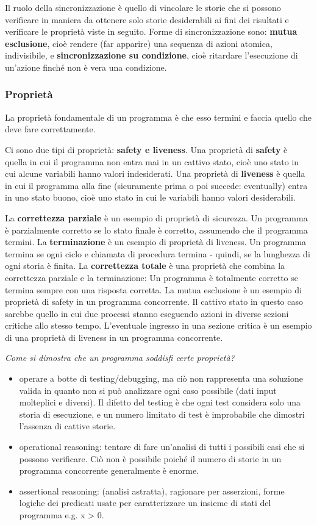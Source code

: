 \documentclass[10pt,a4paper]{article}
\begin{document}
Il ruolo della sincronizzazione è quello di vincolare le storie che si possono verificare in maniera da ottenere solo storie desiderabili ai fini dei risultati e verificare le proprietà viste in seguito.
Forme di sincronizzazione sono: \textbf{mutua esclusione}, cioè rendere (far apparire) una sequenza di azioni atomica, indivisibile, e \textbf{sincronizzazione su condizione}, cioè ritardare l'esecuzione di un'azione finché non è vera una condizione.

\subsubsection{Proprietà}
\label{sec:prop-prog}
La proprietà fondamentale di un programma è che esso termini e faccia quello che deve fare correttamente.

Ci sono due tipi di proprietà: \textbf{safety e liveness}. Una proprietà di \textbf{safety} è quella in cui il programma non entra mai in un cattivo stato, cioè uno stato in cui alcune variabili hanno valori indesiderati.
Una proprietà di \textbf{liveness} è quella in cui il programma alla fine (sicuramente prima o poi succede: eventually) entra in uno stato buono, cioè uno stato in cui le variabili hanno valori desiderabili.

La \textbf{correttezza parziale} è un esempio di proprietà di sicurezza. Un programma è parzialmente corretto se lo stato finale è corretto, assumendo che il programma termini.
La \textbf{terminazione} è un esempio di proprietà di liveness. Un programma termina se ogni ciclo e chiamata di procedura termina - quindi, se la lunghezza di ogni storia è finita. La \textbf{correttezza totale} è una proprietà che combina la correttezza parziale e la terminazione: Un programma è totalmente corretto se termina sempre con una risposta corretta.
La mutua esclusione è un esempio di proprietà di safety in un programma concorrente. Il cattivo stato in questo caso sarebbe quello in cui due processi stanno eseguendo azioni in diverse sezioni critiche allo stesso tempo. L'eventuale ingresso in una sezione critica è un esempio di una proprietà di liveness in un programma concorrente.

\textit{Come si dimostra che un programma soddisfi certe proprietà?}
\begin{itemize}
\item operare a botte di testing/debugging, ma ciò non rappresenta una soluzione valida in quanto non si può analizzare ogni caso possibile (dati input molteplici e diversi). Il difetto del testing è che ogni test considera solo una storia di esecuzione, e un numero limitato di test è improbabile che dimostri l'assenza di cattive storie.
\item operational reasoning: tentare di fare un'analisi di tutti i possibili casi che si possono verificare. Ciò non è possibile poiché il numero di storie in un programma concorrente generalmente è enorme.
\item assertional reasoning: (analisi astratta), ragionare per asserzioni, forme logiche dei predicati usate per caratterizzare un insieme di stati del programma e.g. x > 0.
\end{itemize}
\end{document}
